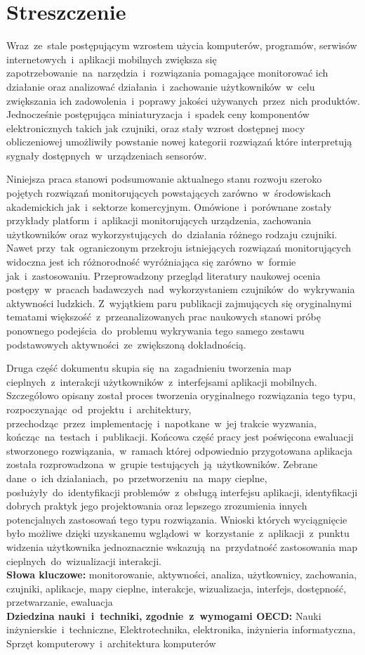 \chapter*{Streszczenie}
Wraz~ze~stale postępującym wzrostem użycia komputerów, programów, serwisów internetowych~i~aplikacji mobilnych zwiększa się zapotrzebowanie~na~narzędzia~i~rozwiązania pomagające monitorować ich działanie oraz analizować działania~i~zachowanie użytkowników~w~celu zwiększania ich zadowolenia~i~poprawy jakości używanych~przez~nich produktów. Jednocześnie postępująca miniaturyzacja~i~spadek ceny komponentów elektronicznych takich jak czujniki, oraz stały wzrost dostępnej mocy obliczeniowej umożliwiły powstanie nowej kategorii rozwiązań które interpretują sygnały dostępnych~w~urządzeniach sensorów. 

Niniejsza praca stanowi podsumowanie aktualnego stanu rozwoju szeroko pojętych rozwiązań monitorujących powstających zarówno~w~środowiskach akademickich jak~i~sektorze komercyjnym. Omówione~i~porównane zostały przykłady platform~i~aplikacji monitorujących urządzenia, zachowania użytkowników oraz wykorzystujących~do~działania różnego rodzaju czujniki. Nawet przy~tak~ograniczonym przekroju istniejących rozwiązań monitorujących widoczna jest ich różnorodność wyróżniająca się zarówno~w~formie jak~i~zastosowaniu. Przeprowadzony przegląd literatury naukowej ocenia postępy~w~pracach badawczych~nad~wykorzystaniem czujników~do~wykrywania aktywności ludzkich. Z~wyjątkiem paru publikacji zajmujących się oryginalnymi tematami większość~z~przeanalizowanych prac naukowych stanowi próbę ponownego podejścia~do~problemu wykrywania tego samego zestawu podstawowych aktywności~ze~zwiększoną dokładnością. 

Druga część dokumentu skupia się~na~zagadnieniu tworzenia map cieplnych~z~interakcji użytkowników~z~interfejsami aplikacji mobilnych. Szczegółowo opisany został proces tworzenia oryginalnego rozwiązania tego typu, rozpoczynając~od~projektu~i~architektury, przechodząc~przez~implementację~i~napotkane~w~jej trakcie wyzwania, kończąc~na~testach~i~publikacji. Końcowa część pracy jest poświęcona ewaluacji stworzonego rozwiązania,~w~ramach której odpowiednio przygotowana aplikacja została rozprowadzona~w~grupie testujących~ją~użytkowników. Zebrane dane~o~ich działaniach,~po~przetworzeniu~na~mapy cieplne, posłużyły~do~identyfikacji problemów~z~obsługą interfejsu aplikacji, identyfikacji dobrych praktyk jego projektowania oraz lepszego zrozumienia innych potencjalnych zastosowań tego typu rozwiązania. Wnioski których wyciągnięcie było możliwe dzięki uzyskanemu wglądowi~w~korzystanie~z~aplikacji~z~punktu widzenia użytkownika jednoznacznie wskazują~na~przydatność zastosowania map cieplnych~do~wizualizacji interakcji. \\

\noindent\textbf{Słowa kluczowe:} monitorowanie, aktywności, analiza, użytkownicy, zachowania, czujniki, aplikacje, mapy cieplne, interakcje, wizualizacja, interfejs, dostępność, przetwarzanie, ewaluacja \\

\noindent\textbf{Dziedzina nauki~i~techniki, zgodnie~z~wymogami OECD:} Nauki inżynierskie~i~techniczne, Elektrotechnika, elektronika, inżynieria informatyczna, Sprzęt komputerowy~i~architektura komputerów
